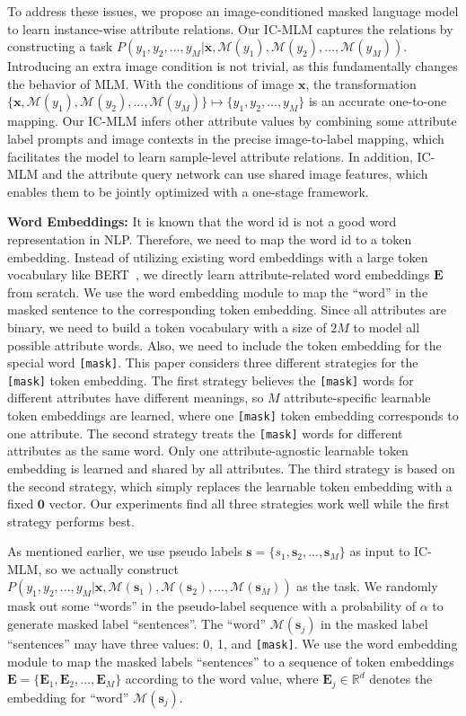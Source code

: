 \documentclass[runningheads]{llncs}
\begin{document}
To address these issues, we propose an image-conditioned masked language model to learn instance-wise attribute relations. Our IC-MLM captures the relations by constructing a task $P(y_1,y_2,..., y_M|\bm{x}, \mathcal{M}(y_1),\mathcal{M}(y_2),...,\mathcal{M}(y_M))$. Introducing an extra image condition is not trivial, as this fundamentally changes the behavior of MLM. With the conditions of image $\bm{x}$, the transformation $\{ \bm{x},\mathcal{M}(y_1),\mathcal{M}(y_2),...,\mathcal{M}(y_M)\} \mapsto \{y_1,y_2,..., y_M\}$ is an accurate one-to-one mapping. Our IC-MLM infers other attribute values by combining some attribute label prompts and image contexts in the precise image-to-label mapping, which facilitates the model to learn sample-level attribute relations. In addition, IC-MLM and the attribute query network can use shared image features, which enables them to be jointly optimized with a one-stage framework.





\textbf{Word Embeddings:}
It is known that the word id is not a good word representation in NLP. Therefore, we need to map the word id to a token embedding. Instead of utilizing existing word embeddings with a large token vocabulary like BERT~\cite{devlin2018bert}, we directly learn attribute-related word embeddings $\bm{E}$ from
scratch. We use the word embedding module to map the ``word'' in the masked sentence to the corresponding token embedding. Since all attributes are binary, we need to build a token vocabulary with a size of $2M$ to model all possible attribute words. Also, we need to include the token embedding for the special word \texttt{[mask]}. This paper considers three different strategies for the \texttt{[mask]} token embedding. The first strategy believes the \texttt{[mask]} words for different attributes have different meanings, so $M$ attribute-specific learnable token embeddings are learned, where one \texttt{[mask]} token embedding corresponds to one attribute. The second strategy treats the \texttt{[mask]} words for different attributes as the same word. Only one attribute-agnostic learnable token embedding is learned and shared by all attributes. The third strategy is based on the second strategy, which simply replaces the learnable token embedding with a fixed $\bm{0}$ vector. Our experiments find all three strategies work well while the first strategy performs best.

As mentioned earlier, we use pseudo labels $\bm{s} = \{s_{1},\bm{s}_{2}, ..., \bm{s}_{M} \}$ as input to IC-MLM, so we actually construct $P(y_1,y_2,..., y_M|\bm{x},\mathcal{M}(\bm{s}_1),\mathcal{M}(\bm{s}_2),...,\mathcal{M}(\bm{s}_M))$ as the task. We randomly mask out some ``words'' in the pseudo-label sequence with a probability of $\alpha$ to generate masked label ``sentences''. The ``word'' $\mathcal{M}(\bm{s}_j)$ in the masked label ``sentences'' may have three values: 0, 1, and \texttt{[mask]}.
We use the word embedding module to map the masked labels ``sentences'' to a sequence of token embeddings $\bm{E} = \{\bm{E}_{1},\bm{E}_{2}, ..., \bm{E}_{M}  \}$ according to the word value,
where $\bm{E}_{j} \in \mathbb{R}^d$ denotes the embedding for ``word'' $\mathcal{M}(\bm{s}_j)$.
\end{document}
